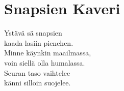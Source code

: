 \section{Snapsien Kaveri}
Ystävä sä snapsien\\
kaada lasiin pienehen.\\
Minne käynkin maailmassa,\\
voin siellä olla humalassa.\\
Seuran taso vaihtelee\\
känni silloin suojelee.